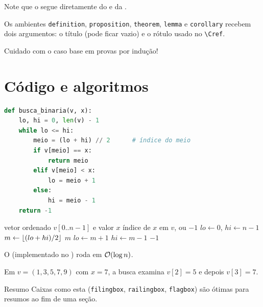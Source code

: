 \documentclass[11pt,a4paper,oneside,openany]{book}
\begin{document}
Note que o  segue diretamente do  e da .

\begin{remark}
Os ambientes \texttt{definition}, \texttt{proposition}, \texttt{theorem},
\texttt{lemma} e \texttt{corollary} recebem dois argumentos: o título (pode ficar vazio)
e o rótulo usado no \verb!\Cref!.
\end{remark}

\begin{warning}
Cuidado com o caso base em provas por indução!
\end{warning}

\section{Código e algoritmos}

\begin{lstlisting}[language=Python,caption={Busca binária},label={cod:busca}]
def busca_binaria(v, x):
    lo, hi = 0, len(v) - 1
    while lo <= hi:
        meio = (lo + hi) // 2      # índice do meio
        if v[meio] == x:
            return meio
        elif v[meio] < x:
            lo = meio + 1
        else:
            hi = meio - 1
    return -1
\end{lstlisting}

\begin{algorithm}[htbp]
\caption{Busca binária}\label{alg:busca}
\begin{algorithmic}[1]
\Require vetor ordenado $v[0..n-1]$ e valor $x$
\Ensure índice de $x$ em $v$, ou $-1$
\State $lo \gets 0$, \; $hi \gets n-1$
    \State $m \gets \floor{(lo+hi)/2}$
     \State \Return $m$
     \State $lo \gets m+1$
    \Else \State $hi \gets m-1$
    \EndIf
\EndWhile
\State \Return $-1$
\end{algorithmic}
\end{algorithm}

O  (implementado no ) roda em $\mathcal{O}\qty(\log n)$.

\begin{example}
Em $v=(1,3,5,7,9)$ com $x=7$, a busca examina $v[2]=5$ e depois $v[3]=7$.
\end{example}

\begin{filingbox}{Resumo}
Caixas como esta (\texttt{filingbox}, \texttt{railingbox}, \texttt{flagbox}) são
ótimas para resumos ao fim de uma seção.
\end{filingbox}
\end{document}
